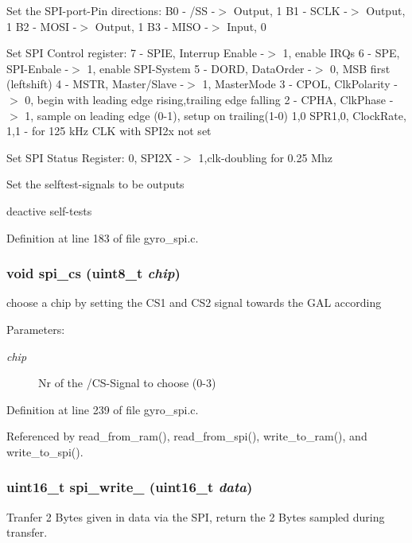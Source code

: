 Set the SPI-port-Pin directions: B0 - /SS -$>$ Output, 1 B1 - SCLK -$>$ Output, 1 B2 - MOSI -$>$ Output, 1 B3 - MISO -$>$ Input, 0

Set SPI Control register: 7 - SPIE, Interrup Enable -$>$ 1, enable IRQs 6 - SPE, SPI-Enbale -$>$ 1, enable SPI-System 5 - DORD, Data\-Order -$>$ 0, MSB first (leftshift) 4 - MSTR, Master/Slave -$>$ 1, Master\-Mode 3 - CPOL, Clk\-Polarity -$>$ 0, begin with leading edge rising,trailing edge falling 2 - CPHA, Clk\-Phase -$>$ 1, sample on leading edge (0-1), setup on trailing(1-0) 1,0 SPR1,0, Clock\-Rate, 1,1 - for 125 k\-Hz CLK with SPI2x not set

Set SPI Status Register: 0, SPI2X -$>$ 1,clk-doubling for 0.25 Mhz

Set the selftest-signals to be outputs

deactive self-tests 

Definition at line 183 of file gyro\_\-spi.c.
\subsubsection{\setlength{\rightskip}{0pt plus 5cm}void spi\_\-cs (uint8\_\-t {\em chip})}\label{group__ro__spi_gf89275f6d086acbd0a0fdfbf4d0cbc8e}


choose a chip by setting the CS1 and CS2 signal towards the GAL according \begin{Desc}
\item[Parameters:]
\begin{description}
\item[{\em chip}]Nr of the /CS-Signal to choose (0-3) \end{description}
\end{Desc}


Definition at line 239 of file gyro\_\-spi.c.

Referenced by read\_\-from\_\-ram(), read\_\-from\_\-spi(), write\_\-to\_\-ram(), and write\_\-to\_\-spi().
\subsubsection{\setlength{\rightskip}{0pt plus 5cm}uint16\_\-t spi\_\-write\_ (uint16\_\-t {\em data})}\label{group__ro__spi_gf202c7a0b210c4af9ffeaf4de3abbff0}


Tranfer 2 Bytes given in data via the SPI, return the 2 Bytes sampled during transfer. 

